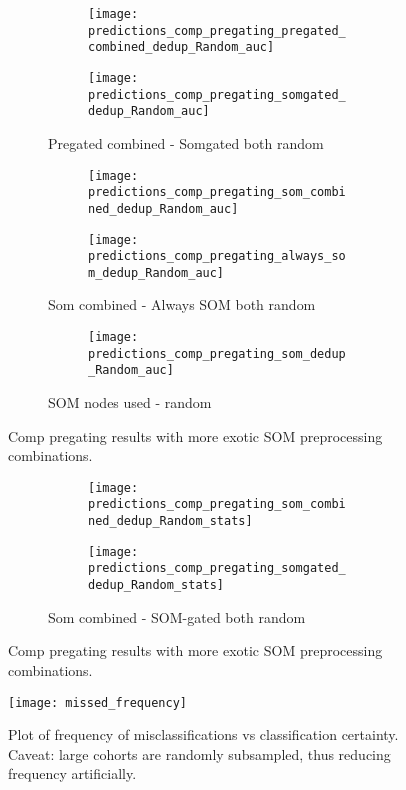 \documentclass[11pt,a4paper]{article}
\begin{document}
\begin{figure}
   \centering
   \begin{subfigure}{\textwidth}
      \begin{subfigure}{0.5\columnwidth}
         \texttt{[image: predictions\_comp\_pregating\_pregated\_combined\_dedup\_Random\_auc]}
      \end{subfigure}
      \begin{subfigure}{0.5\columnwidth}
         \texttt{[image: predictions\_comp\_pregating\_somgated\_dedup\_Random\_auc]}
      \end{subfigure}
      \caption{Pregated combined - Somgated both random}
   \end{subfigure}

   \begin{subfigure}{\textwidth}
      \begin{subfigure}{0.5\columnwidth}
         \texttt{[image: predictions\_comp\_pregating\_som\_combined\_dedup\_Random\_auc]}
      \end{subfigure}
      \begin{subfigure}{0.5\columnwidth}
         \texttt{[image: predictions\_comp\_pregating\_always\_som\_dedup\_Random\_auc]}
      \end{subfigure}
      \caption{Som combined - Always SOM both random}
   \end{subfigure}

   \begin{subfigure}{\textwidth}
      \begin{subfigure}{0.5\columnwidth}
         \texttt{[image: predictions\_comp\_pregating\_som\_dedup\_Random\_auc]}
      \end{subfigure}
      \caption{SOM nodes used - random}
   \end{subfigure}

   \caption{Comp pregating results with more exotic SOM preprocessing combinations.}
\end{figure}

\begin{figure}
   \centering

   \begin{subfigure}{\textwidth}
      \begin{subfigure}{0.5\columnwidth}
         \texttt{[image: predictions\_comp\_pregating\_som\_combined\_dedup\_Random\_stats]}
      \end{subfigure}
      \begin{subfigure}{0.5\columnwidth}
         \texttt{[image: predictions\_comp\_pregating\_somgated\_dedup\_Random\_stats]}
      \end{subfigure}
      \caption{Som combined - SOM-gated both random}
   \end{subfigure}

   \caption{Comp pregating results with more exotic SOM preprocessing combinations.}
\end{figure}

\begin{figure}
   \centering
   \texttt{[image: missed\_frequency]}
   \caption{Plot of frequency of misclassifications vs classification certainty. Caveat: large cohorts are randomly subsampled, thus reducing frequency artificially.}
\end{figure}
\end{document}
